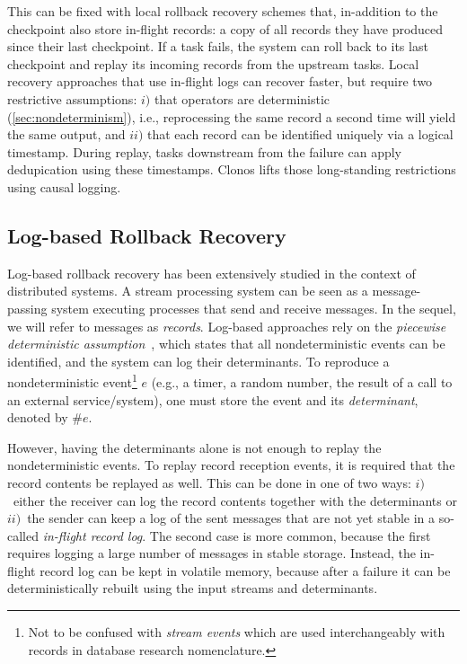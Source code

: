 \documentclass[sigconf]{acmart}
\begin{document}
This can be fixed with local rollback recovery schemes that, in-addition to the checkpoint also store in-flight records: a copy of all records they have produced since their last checkpoint. If a task fails, the system can roll back to its last checkpoint and replay its incoming records from the upstream tasks. Local recovery approaches that use in-flight logs \cite{migliavacca2010seep, FernandezMK13} can recover faster, but require two restrictive assumptions:
$i)$ that operators are deterministic (\autoref{sec:nondeterminism}), i.e., reprocessing the same record a second time will yield the same output, and
$ii)$ that each record can be identified uniquely via a logical timestamp. During replay, tasks downstream from the failure can apply dedupication using these timestamps. Clonos lifts those long-standing restrictions using causal logging.

\subsection{Log-based Rollback Recovery}
\label{sec:logging}

Log-based rollback recovery has been extensively studied in the context of distributed systems. A stream processing system can be seen as a message-passing system executing processes that send and receive messages. In the sequel, we will refer to messages as \textit{records}. 
Log-based approaches rely on the \emph{piecewise deterministic assumption}~\cite{elnozahy2002survey}, which states that all nondeterministic events can be identified, and the system can log their determinants.
To reproduce a nondeterministic event\footnote{Not to be confused with \emph{stream events} which are used interchangeably with records in database research nomenclature.} $e$ (e.g., a timer, a random number, the result of a call to an external service/system), one must store the event and its \textit{determinant}, denoted by \#$e$. 

However, having the determinants alone is not enough to replay the nondeterministic events. To replay record reception events, it is required that the record contents be replayed as well. This can be done in one of two ways: $i)$~either the receiver can log the record contents together with the determinants or $ii)$~the sender can keep a log of the sent messages that are not yet stable in a so-called \textit{in-flight record log}. The second case is more common, because the first requires logging a large number of messages in stable storage.
Instead, the in-flight record log can be kept in volatile memory,
because after a failure it can be deterministically rebuilt using the
input streams and determinants.
\end{document}
